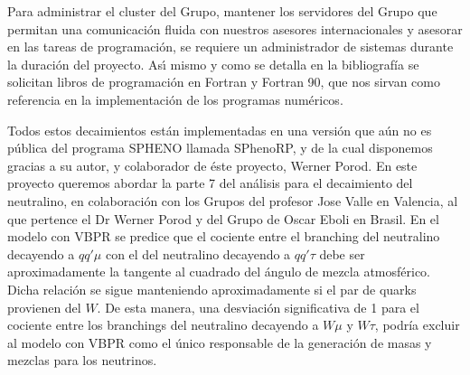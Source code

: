 Para administrar el cluster del Grupo, mantener los servidores del
Grupo que permitan una comunicación fluida con nuestros asesores
internacionales y asesorar en las tareas de programación, se requiere
un administrador de sistemas durante la duración del proyecto. As\'\i{}
mismo y como se detalla en la bibliografía se solicitan libros de
programación en Fortran y Fortran 90, que nos sirvan como referencia
en la implementación de los programas numéricos.


Todos estos decaimientos están implementadas en una versión que aún no
es pública del programa SPHENO %
llamada
SPhenoRP, y de la cual disponemos gracias a su autor, y colaborador de
éste proyecto, Werner Porod. En este proyecto queremos abordar la
parte 7 del análisis para el decaimiento del neutralino, en
colaboración con los Grupos del profesor Jose Valle en Valencia, al
que pertence el Dr Werner Porod y del Grupo de Oscar Eboli en Brasil.
En el modelo con VBPR se predice que el cociente entre el branching
del neutralino decayendo a $qq'\mu$ con el del neutralino decayendo a
$qq'\tau$ debe ser aproximadamente la tangente al cuadrado del ángulo de
mezcla atmosférico. Dicha relación se sigue manteniendo
aproximadamente si el par de quarks provienen del $W$. De
esta manera, una desviación significativa de 1 para el cociente entre
los branchings del neutralino decayendo a $W\mu$ y $W\tau$, podría
excluir al modelo con VBPR como el único responsable de la generación
de masas y mezclas para los neutrinos.


